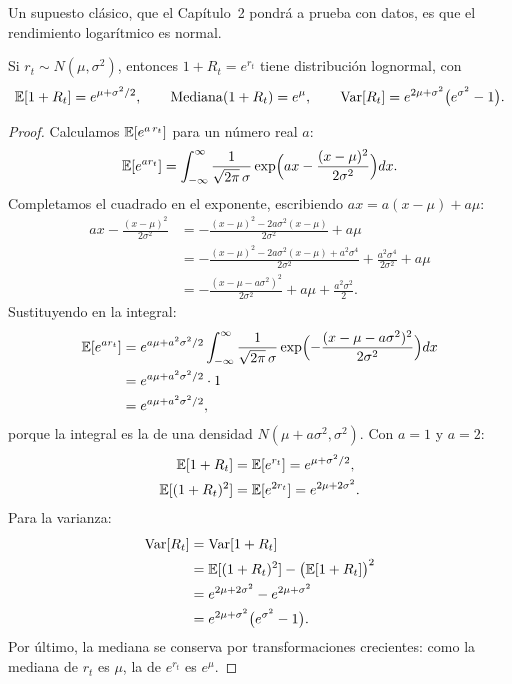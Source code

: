 Un supuesto clásico, que el Capítulo~2 pondrá a prueba con datos, es que el rendimiento logarítmico es
normal.

\begin{proposicion}\label{prop:lognormal}
Si $r_t\sim N(\mu,\sigma^2)$, entonces $1+R_t=e^{r_t}$ tiene distribución lognormal, con
\[
  \mathbb{E}[1+R_t]=e^{\mu+\sigma^2/2},\qquad \operatorname{Mediana}(1+R_t)=e^{\mu},\qquad
  \operatorname{Var}[R_t]=e^{2\mu+\sigma^2}\bigl(e^{\sigma^2}-1\bigr).
\]
\end{proposicion}

\begin{proof}
Calculamos $\mathbb{E}[e^{a\,r_t}]$ para un número real $a$:
\[
  \mathbb{E}[e^{a r_t}]=\int_{-\infty}^{\infty}\frac{1}{\sqrt{2\pi}\,\sigma}
  \exp\Bigl(ax-\frac{(x-\mu)^2}{2\sigma^2}\Bigr)dx .
\]
Completamos el cuadrado en el exponente, escribiendo $ax=a(x-\mu)+a\mu$:
\begin{align*}
  ax-\frac{(x-\mu)^2}{2\sigma^2}
    &= -\frac{(x-\mu)^2-2a\sigma^2(x-\mu)}{2\sigma^2}+a\mu\\
    &= -\frac{(x-\mu)^2-2a\sigma^2(x-\mu)+a^2\sigma^4}{2\sigma^2}+\frac{a^2\sigma^4}{2\sigma^2}+a\mu\\
    &= -\frac{(x-\mu-a\sigma^2)^2}{2\sigma^2}+a\mu+\frac{a^2\sigma^2}{2}.
\end{align*}
Sustituyendo en la integral:
\begin{align*}
  \mathbb{E}[e^{a r_t}]
    &= e^{a\mu+a^2\sigma^2/2}\int_{-\infty}^{\infty}\frac{1}{\sqrt{2\pi}\,\sigma}
       \exp\Bigl(-\frac{(x-\mu-a\sigma^2)^2}{2\sigma^2}\Bigr)dx\\
    &= e^{a\mu+a^2\sigma^2/2}\cdot1\\
    &= e^{a\mu+a^2\sigma^2/2},
\end{align*}
porque la integral es la de una densidad $N(\mu+a\sigma^2,\sigma^2)$. Con $a=1$ y $a=2$:
\begin{align*}
  \mathbb{E}[1+R_t]     &= \mathbb{E}[e^{r_t}] = e^{\mu+\sigma^2/2},\\
  \mathbb{E}[(1+R_t)^2] &= \mathbb{E}[e^{2r_t}] = e^{2\mu+2\sigma^2}.
\end{align*}
Para la varianza:
\begin{align*}
  \operatorname{Var}[R_t] &= \operatorname{Var}[1+R_t]\\
            &= \mathbb{E}[(1+R_t)^2]-\bigl(\mathbb{E}[1+R_t]\bigr)^2\\
            &= e^{2\mu+2\sigma^2}-e^{2\mu+\sigma^2}\\
            &= e^{2\mu+\sigma^2}\bigl(e^{\sigma^2}-1\bigr).
\end{align*}
Por último, la mediana se conserva por transformaciones crecientes: como la mediana de $r_t$ es $\mu$, la
de $e^{r_t}$ es $e^{\mu}$.
\end{proof}

